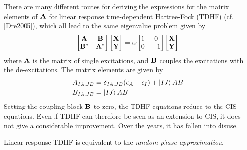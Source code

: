 There are many different routes for deriving the expressions for the matrix elements of $\mathbf{A}$ for linear response time-dependent Hartree-Fock (TDHF) (cf. \ref{Dre2005}), which all lead to the same eigenvalue problem given by 
\begin{equation}
\begin{bmatrix}
\mathbf{A} & \mathbf{B} \\
\mathbf{B}^* & \mathbf{A}^* 
\end{bmatrix} 
\begin{bmatrix}
\mathbf{X} \\
\mathbf{Y} 
\end{bmatrix}
= 
\omega 
\begin{bmatrix}
1 & 0 \\
0 & -1
\end{bmatrix}
\begin{bmatrix}
\mathbf{X} \\
\mathbf{Y} 
\end{bmatrix}
\label{eq:TDSCF}
\end{equation}
\noindent where $\mathbf{A}$ is the matrix of single excitations, and $\mathbf{B}$ couples the excitations with the de-excitations. The matrix elements are given by
\begin{align}
A_{IA,JB} &= \delta_{IA,JB} (\epsilon_A - \epsilon_I) + \ket{\smash{IJ}}{AB} \\
B_{IA,JB} &= \ket{\smash{IJ}}{AB}
\end{align}
\noindent Setting the coupling block $\mathbf{B}$ to zero, the TDHF equations reduce to the CIS equations. Even if TDHF can therefore be seen as an extension to CIS, it does not give a considerable improvement. Over the years, it has fallen into disuse.

Linear response TDHF is equivalent to the \emph{random phase approximation}. 


